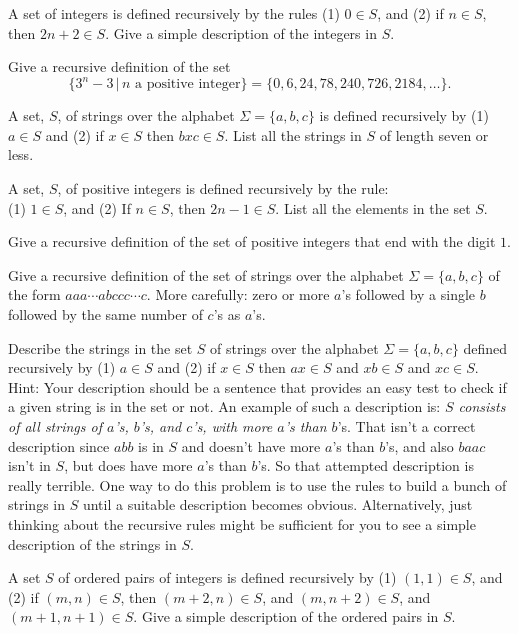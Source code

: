  \begin{prob}
 A set of integers is defined recursively by the rules (1) $0 \in S$, and (2)
 if $n \in S$, then $2n+2 \in S$. Give a simple description of the integers in $S$.
 \end{prob}
 
 \begin{prob}
 Give a recursive definition of the set 
 \[
 \{ 3^n -3\,|\, n \text{ a positive integer}\} = \{0, 6, 24, 78, 240, 726, 2184, \ldots\}.
 \]
 \end{prob} 
 
 \begin{prob}
  A set, $S$, of strings over the alphabet 
$\Sigma = \{a,b,c\}$ is defined recursively by (1) $a \in S$
and (2) if $x\in S$ then $bxc\in S$. List all the strings in $S$ of length seven or less.
\end{prob}

\begin{prob}
 A set, $S$, of positive integers is defined recursively by the rule:\\[2pt]
(1) $1\in S$, and (2) If $n\in S$, then $2n-1\in S$. List all the elements in the set $S$.
\end{prob}
 
 \begin{prob}
  Give a recursive definition of the set of positive integers that end with the digit $1$.
\end{prob}

\begin{prob}
Give a recursive definition of the set of strings over the alphabet $\Sigma = \{a,b,c\}$ of the 
form $aaa\cdots abccc\cdots c$. More carefully: zero or more $a$'s followed by a single $b$ 
followed by the same number of $c$'s as $a$'s.
\end{prob} 

\begin{prob}
Describe the strings in the set $S$ of strings over the alphabet 
$\Sigma = \{a,b,c\}$ defined recursively by (1) $a \in S$
and (2) if $x\in S$ then $ax\in S$ and $xb\in S$ and $xc\in S$.\\[3pt]

Hint: Your description should be a sentence that provides an easy test to check if a given string
is in the set or not. An example of such a description is: {\it $S$ consists of all strings of $a$'s, $b$'s, and $c$'s,
with more $a$'s than $b$}'s. That isn't a correct description since $abb$ is in $S$ and doesn't have more $a$'s than
$b$'s, and also $baac$ isn't in $S$, but does have more $a$'s than $b$'s. So that attempted description is really 
terrible. One way to do this problem is to use the rules to build a bunch of strings in $S$ until a suitable
description becomes obvious.  Alternatively, just thinking about the recursive rules might be sufficient for you to see a simple description of the strings in $S$.
\end{prob}

\begin{prob}
A set $S$ of ordered pairs of integers is defined recursively
by (1) $(1,1)\in S$, and (2) if $(m,n)\in S$, then $(m+2,n)\in S$, and
$(m,n+2)\in S$, and $(m+1,n+1)\in S$. Give a simple description
of the ordered pairs in $S$.
\end{prob}






